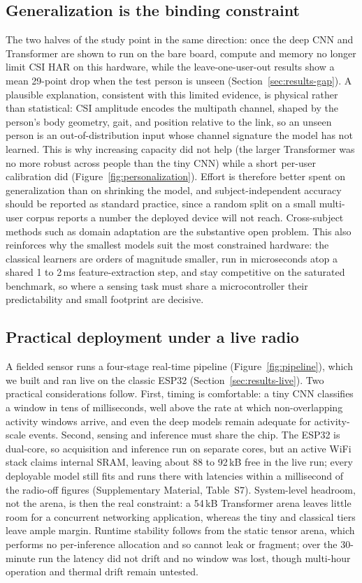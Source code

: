 \documentclass{ieeeaccess}
\begin{document}
\subsection{Generalization is the binding constraint}
The two halves of the study point in the same direction: once the deep CNN and Transformer are shown to run on the bare board, compute and memory no longer limit CSI HAR on this hardware, while the leave-one-user-out results show a mean 29-point drop when the test person is unseen (Section~\ref{sec:results-gap}). A plausible explanation, consistent with this limited evidence, is physical rather than statistical: CSI amplitude encodes the multipath channel, shaped by the person's body geometry, gait, and position relative to the link, so an unseen person is an out-of-distribution input whose channel signature the model has not learned. This is why increasing capacity did not help (the larger Transformer was no more robust across people than the tiny CNN) while a short per-user calibration did (Figure~\ref{fig:personalization}). Effort is therefore better spent on generalization than on shrinking the model, and subject-independent accuracy should be reported as standard practice, since a random split on a small multi-user corpus reports a number the deployed device will not reach. Cross-subject methods such as domain adaptation are the substantive open problem. This also reinforces why the smallest models suit the most constrained hardware: the classical learners are orders of magnitude smaller, run in microseconds atop a shared 1 to 2\,ms feature-extraction step, and stay competitive on the saturated benchmark, so where a sensing task must share a microcontroller their predictability and small footprint are decisive.

\subsection{Practical deployment under a live radio}
A fielded sensor runs a four-stage real-time pipeline (Figure~\ref{fig:pipeline}), which we built and ran live on the classic ESP32 (Section~\ref{sec:results-live}). Two practical considerations follow. First, timing is comfortable: a tiny CNN classifies a window in tens of milliseconds, well above the rate at which non-overlapping activity windows arrive, and even the deep models remain adequate for activity-scale events. Second, sensing and inference must share the chip. The ESP32 is dual-core, so acquisition and inference run on separate cores, but an active WiFi stack claims internal SRAM, leaving about 88 to 92\,kB free in the live run; every deployable model still fits and runs there with latencies within a millisecond of the radio-off figures (Supplementary Material, Table~S7). System-level headroom, not the arena, is then the real constraint: a 54\,kB Transformer arena leaves little room for a concurrent networking application, whereas the tiny and classical tiers leave ample margin. Runtime stability follows from the static tensor arena, which performs no per-inference allocation and so cannot leak or fragment; over the 30-minute run the latency did not drift and no window was lost, though multi-hour operation and thermal drift remain untested.
\end{document}
